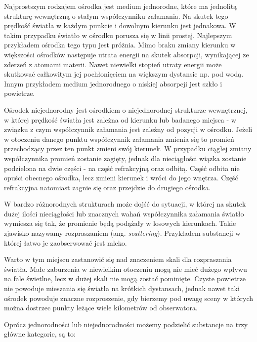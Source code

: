 \documentclass[../main.tex]{subfiles}
\begin{document}
Najprostszym rodzajem ośrodka jest medium jednorodne, które ma jednolitą strukturę wewnętrzną o stałym współczynniku załamania. Na skutek tego prędkość światła w każdym punkcie i dowolnym kierunku jest jednakowa. W takim przypadku światło w ośrodku porusza się w linii prostej. Najlepszym przykładem ośrodka tego typu jest próżnia. Mimo braku zmiany kierunku w większości ośrodków następuje utrata energii na skutek absorpcji, wynikającej ze zderzeń z atomami materii. Nawet niewielki stopień utraty energii może skutkować całkowitym jej pochłonięciem na większym dystansie np. pod wodą. Innym przykładem medium jednorodnego o niskiej absorpcji jest szkło i powietrze.

Ośrodek niejednorodny jest ośrodkiem o niejednorodnej strukturze wewnętrznej, w której prędkość światła jest zależna od kierunku lub badanego miejsca - w związku z czym współczynnik załamania jest zależny od pozycji w ośrodku. Jeżeli w otoczeniu danego punktu współczynnik załamania zmienia się to promień przechodzący przez ten punkt zmieni swój kierunek. W przypadku ciągłej zmiany współczynnika promień zostanie zagięty, jednak dla nieciągłości wiązka zostanie podzielona na dwie części - na część refrakcyjną oraz odbitą. Część odbita nie opuści obecnego ośrodka, lecz zmieni kierunek i wróci do jego wnętrza. Część refrakcyjna natomiast zagnie się oraz przejdzie do drugiego ośrodka. 

W bardzo różnorodnych strukturach może dojść do sytuacji, w której na skutek dużej ilości nieciągłości lub znacznych wahań współczynnika załamania światło wymiesza się tak, że promienie będą podążały w losowych kierunkach. Takie zjawisko nazywamy rozpraszaniem (ang. \textit{scattering}). Przykładem substancji w której łatwo je zaobserwować jest mleko.

Warto w tym miejscu zastanowić się nad znaczeniem skali dla rozpraszania światła. Małe zaburzenia w niewielkim otoczeniu mogą nie mieć dużego wpływu na fale świetlne, lecz w dużej skali nie mogą zostać pominięte. Czyste powietrze nie powoduje mieszania się światła na krótkich dystansach, jednak nawet taki ośrodek powoduje znaczne rozproszenie, gdy bierzemy pod uwagę sceny w których można dostrzec punkty leżące wiele kilometrów od obserwatora. 

Oprócz jednorodności lub niejednorodności możemy podzielić substancje na trzy główne kategorie, są to:
\end{document}
